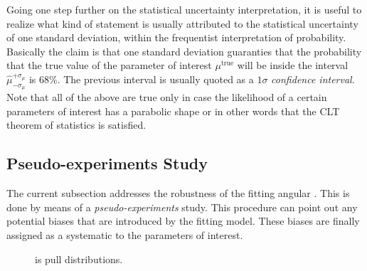 Going one step further on the statistical uncertainty interpretation, it is useful to realize what kind of statement is
usually attributed to the statistical uncertainty of one standard deviation, within the frequentist interpretation of
probability. Basically the claim is that one standard deviation guaranties that the probability that the true value
of the parameter of interest $\mu^{\text{true}}$ will be inside the interval $\hat{\mu}_{-\sigma_\mu}^{+\sigma_\mu}$ is $68\%$.
The previous interval is usually quoted as a $1\sigma$ {\it confidence interval}. Note that all of the above are true
only in case the likelihood of a certain parameters of interest has a parabolic shape or in other words that the CLT
theorem of statistics is satisfied.


\subsection{Pseudo-experiments Study}
\label{Toy_Experiments_Study}

The current subsection addresses the robustness of the fitting angular \pdf.
This is done by means of a  {\it pseudo-experiments} study. This procedure
can point out any potential biases that are introduced by the fitting model.
These biases are finally assigned as a systematic to the parameters of interest.

\begin{figure}[h]
  \centering
  \begin{subfigure}{0.5\textwidth}
    \raggedright
    \scalebox{0.56}{}
    \caption{}
    \label{pull_ACP0}
  \end{subfigure}%
  \hfill%
  \begin{subfigure}{0.5\textwidth}
    \raggedleft
    \scalebox{0.56}{}
    \caption{}
    \label{pull_ACPperp}
  \end{subfigure}
  \begin{subfigure}{0.5\textwidth}
    \raggedright
    \scalebox{0.56}{}
    \caption{}
    \label{pull_ACPpar}
  \end{subfigure}%
  \hfill%
  \begin{subfigure}{0.5\textwidth}
    \raggedleft
    \scalebox{0.56}{}
    \caption{}
    \label{pull_ACPS}
  \end{subfigure}
\caption{\Acp{i} pull distributions.}
\label{pull_acp}
\end{figure}


